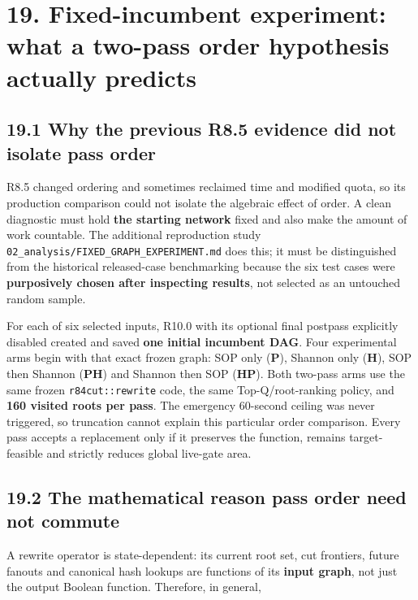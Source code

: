 \section{19. Fixed-incumbent experiment: what a two-pass order hypothesis actually predicts}\label{fixed-incumbent-experiment-what-a-two-pass-order-hypothesis-actually-predicts}

\subsection{19.1 Why the previous R8.5 evidence did not isolate pass order}\label{why-the-previous-r8.5-evidence-did-not-isolate-pass-order}

R8.5 changed ordering and sometimes reclaimed time and modified quota, so its production comparison could not isolate the algebraic effect of order. A clean diagnostic must hold \textbf{the starting network} fixed and also make the amount of work countable. The additional reproduction study \texttt{02\_analysis/FIXED\_GRAPH\_EXPERIMENT.md} does this; it must be distinguished from the historical released-case benchmarking because the six test cases were \textbf{purposively chosen after inspecting results}, not selected as an untouched random sample.

For each of six selected inputs, R10.0 with its optional final postpass explicitly disabled created and saved \textbf{one initial incumbent DAG}. Four experimental arms begin with that exact frozen graph: SOP only (\textbf{P}), Shannon only (\textbf{H}), SOP then Shannon (\textbf{PH}) and Shannon then SOP (\textbf{HP}). Both two-pass arms use the same frozen \texttt{r84cut::rewrite} code, the same Top-Q/root-ranking policy, and \textbf{160 visited roots per pass}. The emergency 60-second ceiling was never triggered, so truncation cannot explain this particular order comparison. Every pass accepts a replacement only if it preserves the function, remains target-feasible and strictly reduces global live-gate area.

\subsection{19.2 The mathematical reason pass order need not commute}\label{the-mathematical-reason-pass-order-need-not-commute}

A rewrite operator is state-dependent: its current root set, cut frontiers, future fanouts and canonical hash lookups are functions of its \textbf{input graph}, not just the output Boolean function. Therefore, in general,

